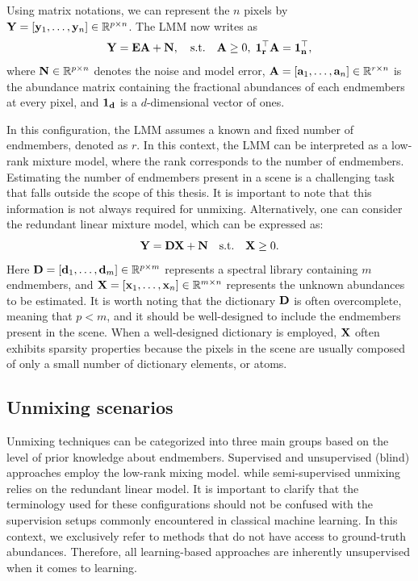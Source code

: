 Using matrix notations, we can represent the $n$ pixels by $\mathbf Y = \left[\mathbf y_1, \ldots, \mathbf y_n\right] \in \mathbb R^{p \times n}$.
The LMM now writes as
\begin{equation}
    \label{eq:LMM}
    \mathbf Y = \mathbf E \mathbf A + \mathbf N, \quad \text{s.t.} \quad \mathbf A \geq 0, \; \bf 1_r^{\top} \mathbf A = \bf 1_n^{\top}, 
\end{equation}
where $\mathbf N \in \mathbb R^{p \times n}$ denotes the noise and model error, $\mathbf A = \left[\mathbf a_1, \ldots, \mathbf a_n\right] \in \mathbb R^{r \times n}$ is the abundance matrix containing the fractional abundances of each endmembers at every pixel, and $\bf 1_d$ is a $d$-dimensional vector of ones.

In this configuration, the LMM assumes a known and fixed number of endmembers, denoted as $r$.
In this context, the LMM can be interpreted as a low-rank mixture model, where the rank corresponds to the number of endmembers.
Estimating the number of endmembers present in a scene is a challenging task that falls outside the scope of this thesis.
It is important to note that this information is not always required for unmixing.
Alternatively, one can consider the redundant linear mixture model, which can be expressed as:
\begin{equation}
    \label{eq:redundant}
    \mathbf Y = \mathbf D \mathbf X + \mathbf N \quad \text{s.t.} \quad \mathbf X \geq 0.
\end{equation}
Here $\mathbf D = \left[\mathbf d_1, \ldots, \mathbf d_m\right] \in \mathbb R^{p \times m}$ represents a spectral library containing $m$ endmembers, and $\mathbf X = \left[\mathbf x_1, \ldots, \mathbf x_n\right] \in \mathbb R^{m \times n}$ represents the unknown abundances to be estimated.
It is worth noting that the dictionary $\mathbf D$ is often overcomplete, meaning that $p < m$, and it should be well-designed to include the endmembers present in the scene.
When a well-designed dictionary is employed, $\mathbf X$ often exhibits sparsity properties because the pixels in the scene are usually composed of only a small number of dictionary elements, or atoms.



\subsection{Unmixing scenarios}

Unmixing techniques can be categorized into three main groups based on the level of prior knowledge about endmembers.
Supervised and unsupervised (blind) approaches employ the low-rank mixing model. while semi-supervised unmixing relies on the redundant linear model.
It is important to clarify that the terminology used for these configurations should not be confused with the supervision setups commonly encountered in classical machine learning.
In this context, we exclusively refer to methods that do not have access to ground-truth abundances.
Therefore, all learning-based approaches are inherently unsupervised when it comes to learning.

